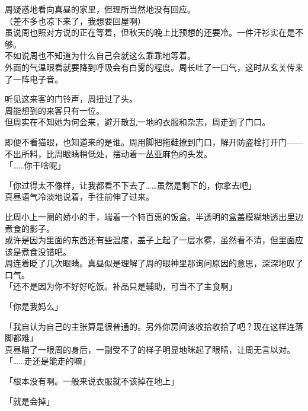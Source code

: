 周疑惑地看向真昼的家里，但理所当然地没有回应。\\

（差不多也凉下来了，我想要回屋啊）\\

虽说周也照对方说的正在等着，但秋天的晚上比预想的还要冷。一件汗衫实在是不够。\\

不如说周也不知道为什么自己会就这么乖乖地等着。\\

外面的气温眼看就要降到呼吸会有白雾的程度。周长吐了一口气，这时从玄关传来了一阵电子音。

听见这来客的门铃声，周扭过了头。\\

周能想到的来客只有一位。\\

但周实在不知她为何会来，避开散乱一地的衣服和杂志，周走到了门口。

即便不看猫眼，也知道来的是谁。周用脚把拖鞋撩到门口，解开防盗栓打开门——不出所料，比周眼睛稍低处，摆动着一丛亚麻色的头发。\\

「……你干啥呢」

「你过得太不像样，让我都看不下去了……虽然是剩下的，你拿去吧」\\

真昼语气冷淡地说着，手往前伸了过来。

比周小上一圈的娇小的手，端着一个特百惠的饭盒。半透明的盒盖模糊地透出里边煮食的影子。\\

或许是因为里面的东西还有些温度，盖子上起了一层水雾，虽然看不清，但里面应该是煮食没错吧。\\

周连着眨了几次眼睛。真昼似是理解了周的眼神里那询问原因的意思，深深地叹了口气。\\

「还不是因为你不好好吃饭。补品只是辅助，可当不了主食啊」

「你是我妈么」

「我自认为自己的主张算是很普通的。另外你房间该收拾收拾了吧？现在这样连落脚都难」\\

真昼瞄了一眼周的身后，一副受不了的样子明显地眯起了眼睛，让周无言以对。\\

「……走还是能走的嘛」

「根本没有啊。一般来说衣服就不该掉在地上」

「就是会掉」

